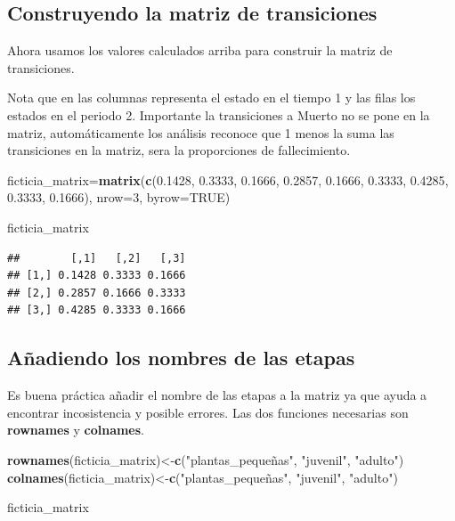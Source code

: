 \documentclass[
]{book}
\newenvironment{Shaded}{\begin{snugshade}}{\end{snugshade}}
\newcommand{\AttributeTok}[1]{\textcolor[rgb]{0.13,0.29,0.53}{#1}}
\newcommand{\ConstantTok}[1]{\textcolor[rgb]{0.56,0.35,0.01}{#1}}
\newcommand{\DecValTok}[1]{\textcolor[rgb]{0.00,0.00,0.81}{#1}}
\newcommand{\FloatTok}[1]{\textcolor[rgb]{0.00,0.00,0.81}{#1}}
\newcommand{\FunctionTok}[1]{\textcolor[rgb]{0.13,0.29,0.53}{\textbf{#1}}}
\newcommand{\NormalTok}[1]{#1}
\newcommand{\OtherTok}[1]{\textcolor[rgb]{0.56,0.35,0.01}{#1}}
\newcommand{\StringTok}[1]{\textcolor[rgb]{0.31,0.60,0.02}{#1}}
\theoremstyle{definition}
\theoremstyle{definition}
\theoremstyle{definition}
\theoremstyle{definition}
\theoremstyle{remark}
\begin{document}
\subsection{Construyendo la matriz de transiciones}\label{construyendo-la-matriz-de-transiciones}

Ahora usamos los valores calculados arriba para construir la matriz de transiciones.

Nota que en las columnas representa el estado en el tiempo 1 y las filas los estados en el periodo 2. Importante la transiciones a Muerto no se pone en la matriz, automáticamente los análisis reconoce que 1 menos la suma las transiciones en la matriz, sera la proporciones de fallecimiento.

\begin{Shaded}
\begin{Highlighting}[]
\NormalTok{ficticia\_matrix}\OtherTok{=}\FunctionTok{matrix}\NormalTok{(}\FunctionTok{c}\NormalTok{(}\FloatTok{0.1428}\NormalTok{, }\FloatTok{0.3333}\NormalTok{, }\FloatTok{0.1666}\NormalTok{,}
                         \FloatTok{0.2857}\NormalTok{, }\FloatTok{0.1666}\NormalTok{, }\FloatTok{0.3333}\NormalTok{,}
                         \FloatTok{0.4285}\NormalTok{, }\FloatTok{0.3333}\NormalTok{, }\FloatTok{0.1666}\NormalTok{), }
                            \AttributeTok{nrow=}\DecValTok{3}\NormalTok{, }\AttributeTok{byrow=}\ConstantTok{TRUE}\NormalTok{)}

\NormalTok{ficticia\_matrix}
\end{Highlighting}
\end{Shaded}

\begin{verbatim}
##        [,1]   [,2]   [,3]
## [1,] 0.1428 0.3333 0.1666
## [2,] 0.2857 0.1666 0.3333
## [3,] 0.4285 0.3333 0.1666
\end{verbatim}

\subsection{Añadiendo los nombres de las etapas}\label{auxf1adiendo-los-nombres-de-las-etapas}

Es buena práctica añadir el nombre de las etapas a la matriz ya que ayuda a encontrar incosistencia y posible errores. Las dos funciones necesarias son \textbf{rownames} y \textbf{colnames}.

\begin{Shaded}
\begin{Highlighting}[]
\FunctionTok{rownames}\NormalTok{(ficticia\_matrix)}\OtherTok{\textless{}{-}}\FunctionTok{c}\NormalTok{(}\StringTok{"plantas\_pequeñas"}\NormalTok{, }\StringTok{"juvenil"}\NormalTok{, }\StringTok{"adulto"}\NormalTok{)}
\FunctionTok{colnames}\NormalTok{(ficticia\_matrix)}\OtherTok{\textless{}{-}}\FunctionTok{c}\NormalTok{(}\StringTok{"plantas\_pequeñas"}\NormalTok{, }\StringTok{"juvenil"}\NormalTok{, }\StringTok{"adulto"}\NormalTok{)}

\NormalTok{ficticia\_matrix}
\end{Highlighting}
\end{Shaded}
\end{document}

